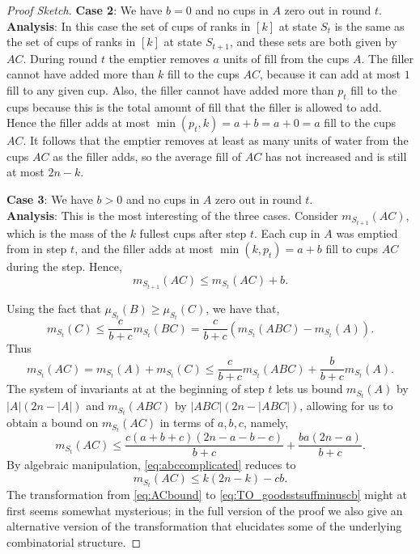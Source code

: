 \begin{proof}[Proof Sketch]
\noindent\textbf{Case 2}:
We have $b = 0$ and no cups in $A$ zero out in round $t$.\\
\textbf{Analysis}: In this case the set of cups of ranks in $[k]$ at
state $S_t$ is the same as the set of cups of ranks in $[k]$ at state
$S_{t+1}$, and these sets are both given by $AC$. During round $t$ the
emptier removes $a$ units of fill from the cups $A$. The filler cannot
have added more than $k$ fill to the cups $AC$, because it can add at
most $1$ fill to any given cup. Also, the filler cannot have added
more than $p_t$ fill to the cups because this is the total amount of
fill that the filler is allowed to add. Hence the filler adds at most
$\min(p_t, k) = a+b=a+0=a$ fill to the cups $AC$. It follows that the
emptier removes at least as many units of water from the cups $AC$ as
the filler adds, so the average fill of $AC$ has not increased and is
still at most $2n-k$.

\vspace{.3 cm}

\noindent\textbf{Case 3}:
We have $b > 0$ and no cups in $A$ zero out in round $t$. \\
\textbf{Analysis}:
This is the most interesting of the three cases. Consider
$m_{S_{t+1}}(AC)$, which is the mass of the $k$ fullest
cups after step $t$. Each cup in $A$ was emptied from in step $t$, and the
filler adds at most $\min(k, p_t) = a+b$ fill to cups $AC$ during the step. 
Hence, 
\begin{equation}
  \label{eq:TO_bplusmAC}
m_{S_{t+1}}(AC) \le m_{S_t}(AC) + b.
\end{equation}

Using the fact that $\mu_{S_t}(B) \ge \mu_{S_t}(C)$, we have that, 
$$m_{S_t}(C) \le \frac{c}{b+c} m_{S_t}(BC) = \frac{c}{b+c}(m_{S_t}(ABC) - m_{S_t}(A)).$$
Thus
\begin{equation}
  m_{S_{t}}(AC) = m_{S_t}(A) + m_{S_t}(C) \le \frac{c}{b+c}m_{S_t}(ABC) + \frac{b}{b+c}m_{S_t}(A).
  \label{eq:ACbound}
\end{equation} 
The system of invariants at at the beginning of step $t$ lets us
bound $m_{S_t}(A)$ by $|A|(2n - |A|)$ and $m_{S_t}(ABC)$ by
$|ABC|(2n - |ABC|)$, allowing for us to obtain a bound on
$m_{S_{t}}(AC)$ in terms of $a, b, c$, namely, 
\begin{equation}
  m_{S_{t}}(AC) \le \frac{c(a+b+c) (2n - a-b-c)}{b+c} + \frac{b
  a(2n-a)}{b+c}.
  \label{eq:abccomplicated}
\end{equation}
By algebraic manipulation, \eqref{eq:abccomplicated} reduces to
\begin{equation}
  \label{eq:TO_goodsstsuffminuscb}
  m_{S_t}(AC) \le  k(2n-k)-cb.
\end{equation}
The transformation from \eqref{eq:ACbound} to
\eqref{eq:TO_goodsstsuffminuscb} might at first seems somewhat
mysterious; in the full version of the proof we also give an
alternative version of the transformation that elucidates some of
the underlying combinatorial structure.


\end{proof}

